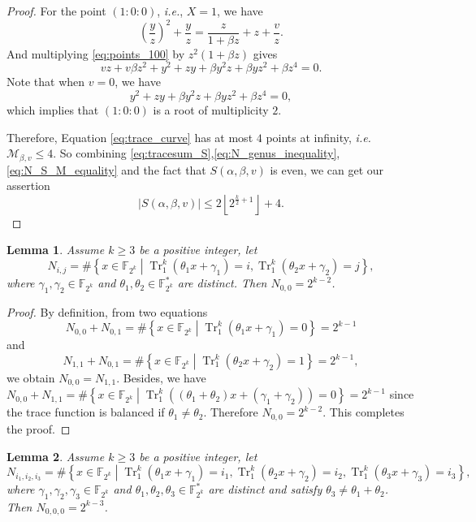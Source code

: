 \documentclass{article}
\newcommand{\F}{\mathbb{F}}
\newcommand{\0}{\textbf{0}}
\newcommand{\1}{\textbf{1}}
\newcommand{\TRACE}{\operatorname{Tr}_1^k}
\theoremstyle{plain}
\newtheorem{lemma}{Lemma}
\begin{document}
\begin{proof}
        For the point $(1 : 0 : 0)$, \emph{i.e.}, $X = 1$, we have
        \begin{equation}\label{eq:points_100}
            \left( \frac{y}{z} \right)^2+\frac{y}{z}=\frac{z}{1+\beta z}+z+\frac{v}{z}.
        \end{equation}
        And multiplying \eqref{eq:points_100} by $z^2(1+\beta z)$ gives
        \[vz+v\beta z^2+y^2+zy+\beta y^2z+\beta yz^2+\beta z^4=0.\]
        Note that when $v=0$, we have
        \[y^2+zy+\beta y^2z+\beta yz^2+\beta z^4=0,\]
        which implies that $(1:0:0)$ is a root of multiplicity $2$.

        Therefore, Equation \eqref{eq:trace_curve} has at most $4$ points at infinity, \emph{i.e.}
        $\mathcal{M}_{\beta,v}\le 4$.
        So combining \eqref{eq:tracesum_S},\eqref{eq:N_genus_inequality},\eqref{eq:N_S_M_equality} and the fact that
        $S(\alpha,\beta,v)$ is even, we can get our assertion
        \[\left\lvert S(\alpha,\beta,v)\right\rvert \le 2\left\lfloor 2^{\frac{k}{2}+1}\right\rfloor+4.\]
    \end{proof}

    \begin{lemma}\label{lemma:N_ij_trace}
        Assume  $k\ge 3$ be a positive integer, let
        \[ N_{i,j} =\#\left\{x\in\F_{2^k}\middle|\TRACE\left(\theta_1x+\gamma_1\right)=i,\TRACE\left(\theta_2x+\gamma_2\right)=j\right\}, \]
        where  $\gamma_1,\gamma_2\in\F_{2^k}$ and $\theta_1,\theta_2\in\F_{2^k}^*$ are distinct. Then $N_{0,0} =2^{k-2}$.
    \end{lemma}

   \begin{proof}
        By definition, from two equations 
        \[N_{0,0}+N_{0,1}=\#\left\{x\in\F_{2^k}\middle|\TRACE\left(\theta_1x+\gamma_1\right)=0\right\}=2^{k-1}\]
        and 
        \[N_{1,1}+N_{0,1}=\#\left\{x\in\F_{2^k}\middle|\TRACE\left(\theta_2x+\gamma_2\right)=1\right\}=2^{k-1},\]
        we obtain $N_{0,0} = N_{1,1}$. 
        Besides, we have $N_{0,0}+N_{1,1} = \#\left\{x\in\F_{2^k}\middle|\TRACE\left((\theta_1+\theta_2)x+(\gamma_1+\gamma_2)\right)=0\right\}=2^{k-1}$
        since the trace function is balanced if $\theta_1\ne\theta_2$.
        Therefore $N_{0,0}=2^{k-2}$. This completes the proof.
   \end{proof}

    \begin{lemma}\label{lemma:N_ijk_trace}
        Assume $k\ge 3$ be a positive integer, let
        \[ N_{i_1,i_2,i_3}=\#\left\{x\in\F_{2^k}\middle| \TRACE\left(\theta_1x+\gamma_1\right)=i_1,\TRACE\left(\theta_2x+\gamma_2\right)=i_2,\TRACE\left(\theta_3x+\gamma_3\right)=i_3 \right\},\]
        where  $\gamma_1,\gamma_2,\gamma_3\in\F_{2^k}$ and $\theta_1,\theta_2,\theta_3\in\F_{2^k}^*$ are distinct and satisfy
        $\theta_3\ne\theta_1+\theta_2$. Then $N_{0,0,0}= 2^{k-3}$.
    \end{lemma}
\end{document}
